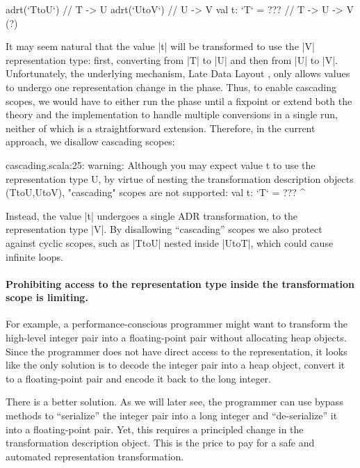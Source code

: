 \begin{lstlisting-nobreak}
adrt(`TtoU`) {             // T -> U
  adrt(`UtoV`) {           // U -> V
    val t: `T` = ???       // T -> U -> V (?)
  }
}
\end{lstlisting-nobreak}

It may seem natural that the value |t| will be transformed to use the |V| representation type: first, converting from |T| to |U| and then from |U| to |V|. Unfortunately, the underlying mechanism, Late Data Layout \cite{ldl}, only allows values to undergo one representation change in the \coerce{} phase. Thus, to enable cascading scopes, we would have to either run the \coerce{} phase until a fixpoint or extend both the theory and the implementation to handle multiple conversions in a single run, neither of which is a straightforward extension.
Therefore, in the current approach, we disallow cascading scopes:

\begin{lstlisting-nobreak}
cascading.scala:25:  warning: Although you may expect value t to use the representation type U, by virtue of nesting the transformation description objects (TtoU,UtoV), "cascading" scopes are not supported:
val t: `T` = ???
         ^
\end{lstlisting-nobreak}

Instead, the value |t| undergoes a single ADR transformation, to the representation type |V|. By disallowing ``cascading'' scopes we also protect against cyclic scopes, such as |TtoU| nested inside |UtoT|, which could cause infinite loops.


\paragraph*{Prohibiting access to the representation type inside the transformation scope is limiting.} For example, a per\-for\-mance-conscious programmer might want to transform the high-level integer pair into a floating-point pair without allocating heap objects. Since the programmer does not have direct access to the representation, it looks like the only solution is to decode the integer pair into a heap object, convert it to a floating-point pair and encode it back to the long integer.

There is a better solution. As we will later see, the programmer can use bypass methods to ``serialize'' the integer pair into a long integer and ``de-serialize'' it into a floating-point pair. Yet, this requires a principled change in the transformation description object. This is the price to pay for a safe and automated representation transformation.

